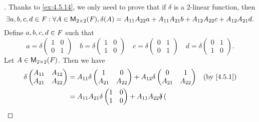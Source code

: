 \begin{proof}[]
	Thanks to \cref{ex:4.5.14}, we only need to prove that if \(\delta\) is a \(2\)-linear function, then
	\[
		\exists a, b, c, d \in \mathit{F} : \forall A \in \mathsf{M}_{{2} \times 2}({\mathit{F}}), \delta(A) = A_{1 1} A_{2 2} a + A_{1 1} A_{2 1} b + A_{1 2} A_{2 2} c + A_{1 2} A_{2 1} d.
	\]
	Define \(a, b, c, d \in \mathit{F}\) such that
	\[
		a = \delta\begin{pmatrix}
			1 & 0 \\
			0 & 1
		\end{pmatrix} \quad b = \delta\begin{pmatrix}
			1 & 0 \\
			1 & 0
		\end{pmatrix} \quad c = \delta\begin{pmatrix}
			0 & 1 \\
			0 & 1
		\end{pmatrix} \quad d = \delta\begin{pmatrix}
			0 & 1 \\
			1 & 0
		\end{pmatrix}.
	\]
	Let \(A \in \mathsf{M}_{{2} \times 2}({\mathit{F}})\).
	Then we have
	\begin{align*}
		\delta\begin{pmatrix}
			      A_{1 1} & A_{1 2} \\
			      A_{2 1} & A_{2 2}
		      \end{pmatrix} & = A_{1 1} \delta\begin{pmatrix}
			                                      1       & 0       \\
			                                      A_{2 1} & A_{2 2}
		                                      \end{pmatrix} + A_{1 2} \delta\begin{pmatrix}
			                                                                    0       & 1       \\
			                                                                    A_{2 1} & A_{2 2}
		                                                                    \end{pmatrix}                                    &  & \by{4.5.1}                 \\
		                      & = A_{1 1} A_{2 1} \delta\begin{pmatrix}
			                                                1 & 0 \\
			                                                1 & 0
		                                                \end{pmatrix} + A_{1 1} A_{2 2} \delta\begin{pmatrix}

\end{pmatrix}
\end{align*}
\end{proof}
